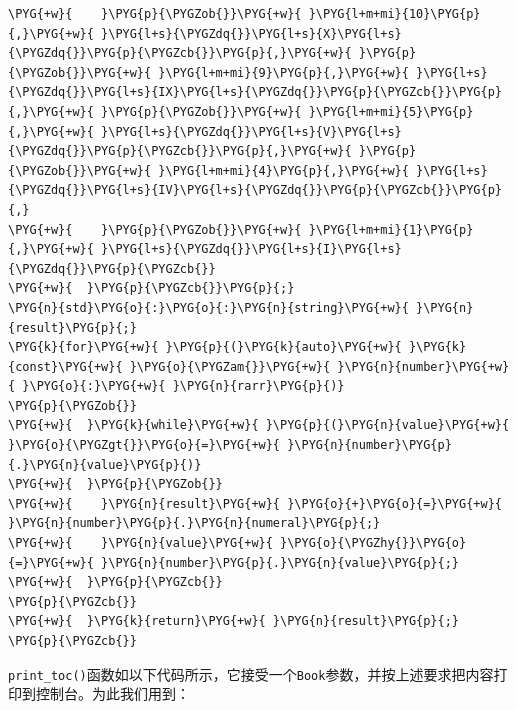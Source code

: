 \begin{codeblockbg}
\begin{Verbatim}[commandchars=\\\{\},breaklines=true,breakanywhere=true,fontsize=\codefont,xleftmargin=17bp]
\PYG{+w}{    }\PYG{p}{\PYGZob{}}\PYG{+w}{ }\PYG{l+m+mi}{10}\PYG{p}{,}\PYG{+w}{ }\PYG{l+s}{\PYGZdq{}}\PYG{l+s}{X}\PYG{l+s}{\PYGZdq{}}\PYG{p}{\PYGZcb{}}\PYG{p}{,}\PYG{+w}{ }\PYG{p}{\PYGZob{}}\PYG{+w}{ }\PYG{l+m+mi}{9}\PYG{p}{,}\PYG{+w}{ }\PYG{l+s}{\PYGZdq{}}\PYG{l+s}{IX}\PYG{l+s}{\PYGZdq{}}\PYG{p}{\PYGZcb{}}\PYG{p}{,}\PYG{+w}{ }\PYG{p}{\PYGZob{}}\PYG{+w}{ }\PYG{l+m+mi}{5}\PYG{p}{,}\PYG{+w}{ }\PYG{l+s}{\PYGZdq{}}\PYG{l+s}{V}\PYG{l+s}{\PYGZdq{}}\PYG{p}{\PYGZcb{}}\PYG{p}{,}\PYG{+w}{ }\PYG{p}{\PYGZob{}}\PYG{+w}{ }\PYG{l+m+mi}{4}\PYG{p}{,}\PYG{+w}{ }\PYG{l+s}{\PYGZdq{}}\PYG{l+s}{IV}\PYG{l+s}{\PYGZdq{}}\PYG{p}{\PYGZcb{}}\PYG{p}{,}
\PYG{+w}{    }\PYG{p}{\PYGZob{}}\PYG{+w}{ }\PYG{l+m+mi}{1}\PYG{p}{,}\PYG{+w}{ }\PYG{l+s}{\PYGZdq{}}\PYG{l+s}{I}\PYG{l+s}{\PYGZdq{}}\PYG{p}{\PYGZcb{}}
\PYG{+w}{  }\PYG{p}{\PYGZcb{}}\PYG{p}{;}
\PYG{n}{std}\PYG{o}{:}\PYG{o}{:}\PYG{n}{string}\PYG{+w}{ }\PYG{n}{result}\PYG{p}{;}
\PYG{k}{for}\PYG{+w}{ }\PYG{p}{(}\PYG{k}{auto}\PYG{+w}{ }\PYG{k}{const}\PYG{+w}{ }\PYG{o}{\PYGZam{}}\PYG{+w}{ }\PYG{n}{number}\PYG{+w}{ }\PYG{o}{:}\PYG{+w}{ }\PYG{n}{rarr}\PYG{p}{)}
\PYG{p}{\PYGZob{}}
\PYG{+w}{  }\PYG{k}{while}\PYG{+w}{ }\PYG{p}{(}\PYG{n}{value}\PYG{+w}{ }\PYG{o}{\PYGZgt{}}\PYG{o}{=}\PYG{+w}{ }\PYG{n}{number}\PYG{p}{.}\PYG{n}{value}\PYG{p}{)}
\PYG{+w}{  }\PYG{p}{\PYGZob{}}
\PYG{+w}{    }\PYG{n}{result}\PYG{+w}{ }\PYG{o}{+}\PYG{o}{=}\PYG{+w}{ }\PYG{n}{number}\PYG{p}{.}\PYG{n}{numeral}\PYG{p}{;}
\PYG{+w}{    }\PYG{n}{value}\PYG{+w}{ }\PYG{o}{\PYGZhy{}}\PYG{o}{=}\PYG{+w}{ }\PYG{n}{number}\PYG{p}{.}\PYG{n}{value}\PYG{p}{;}
\PYG{+w}{  }\PYG{p}{\PYGZcb{}}
\PYG{p}{\PYGZcb{}}
\PYG{+w}{  }\PYG{k}{return}\PYG{+w}{ }\PYG{n}{result}\PYG{p}{;}
\PYG{p}{\PYGZcb{}}
\end{Verbatim}
\end{codeblockbg}



\texttt{print\_\allowbreak{}toc()}函数如以下代码所示，它接受一个\texttt{Book}参数，并按上述要求把内容打印到控制台。为此我们用到：



